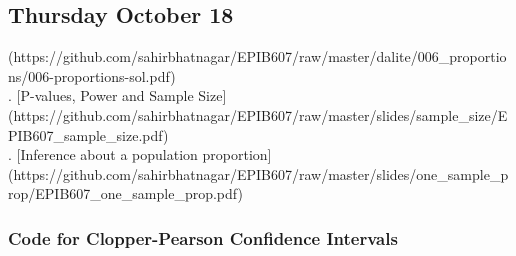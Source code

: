 \documentclass[]{book}
\let\originaltabular\tabular
\let\endoriginaltabular\endtabular
\renewenvironment{tabular}[1]{%
  \begingroup%
  \centering%
  \originaltabular{#1}}%
  {\endoriginaltabular\endgroup}
\theoremstyle{definition}
\theoremstyle{definition}
\theoremstyle{definition}
\theoremstyle{remark}
\begin{document}
\subsection{Thursday October 18}\label{thursday-october-18}

\begin{table}[H]
\centering
\begin{tabular}{l}
(https://github.com/sahirbhatnagar/EPIB607/raw/master/dalite/006\_proportions/006-proportions-sol.pdf)\\
. [P-values, Power and Sample Size](https://github.com/sahirbhatnagar/EPIB607/raw/master/slides/sample\_size/EPIB607\_sample\_size.pdf)\\
. [Inference about a population proportion](https://github.com/sahirbhatnagar/EPIB607/raw/master/slides/one\_sample\_prop/EPIB607\_one\_sample\_prop.pdf)\\
\hline
\end{tabular}
\end{table}

\subsubsection{Code for Clopper-Pearson Confidence
Intervals}\label{code-for-clopper-pearson-confidence-intervals}
\end{document}
